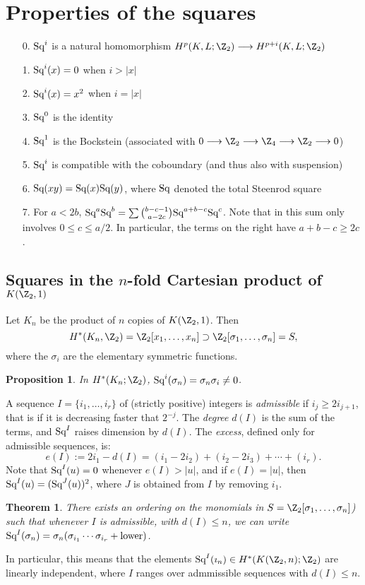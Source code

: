 \documentclass[11pt]{article}
\newcommand{\Squ}{\textup{Sq}}
\theoremstyle{plain}
\newtheorem*{thm*}{Theorem}
\newtheorem*{prop*}{Proposition}
\theoremstyle{definition}
\renewcommand{\to}{\longrightarrow}
\newcommand{\squishlist}{
  \setlength{\itemsep}{1pt}
  \setlength{\parskip}{0pt}
  \setlength{\parsep}{0pt}
}
\begin{document}
\section{Properties of the squares}
\begin{enumerate}
\squishlist
\item[0.] $\Squ^i$ is a natural homomorphism $H^p(K,L;\Z_2)\to H^{p+i}(K,L;\Z_2)$
\item[1.] $\Squ^i(x)=0$ when $i>|x|$
\item[2.] $\Squ^i(x)=x^2$ when $i=|x|$
\item[3.] $\Squ^0$ is the identity
\item[4.] $\Squ^1$ is the Bockstein (associated with $0\to\Z_2\to\Z_4\to\Z_2\to0$)
\item[5.] $\Squ^i$ is compatible with the coboundary (and thus also with suspension)
\item[6.] $\Squ(xy)=\Squ(x)\Squ(y)$, where $\Squ$ denoted the total Steenrod square
\item[7.] For $a<2b$, $\Squ^a\Squ^b=\sum{b-c-1\choose a-2c}\Squ^{a+b-c}\Squ^c$. Note that in this sum only involves $0\leq c\leq a/2$. In particular, the terms on the right have $a+b-c\geq 2c$.
\end{enumerate}
\setcounter{subsection}{2}
\subsection{Squares in the $n$-fold Cartesian product of $K(\Z_2,1)$}
Let $K_n$ be the product of $n$ copies of $K(\Z_2,1)$. Then 
\[H^*(K_n,\Z_2)=\Z_2[x_1,\ldots,x_n]\supset\Z_2[\sigma_1,\ldots,\sigma_n]=S,\]
where the $\sigma_i$ are the elementary symmetric functions.


\begin{prop*}
In $H^*(K_n;\Z_2)$, $\Squ^i(\sigma_n)=\sigma_n\sigma_i\neq0$.
\end{prop*}
A sequence $I=\{i_1,\ldots,i_r\}$ of (strictly positive) integers is \emph{admissible} if $i_j\geq 2i_{j+1}$, that is if it is decreasing faster that $2^{-j}$. The \emph{degree} $d(I)$ is the sum of the terms, and $\Squ^I$ raises dimension by $d(I)$. The \emph{excess}, defined only for admissible sequences, is:
\[e(I):=2i_1-d(I)=(i_1-2i_2)+(i_2-2i_3)+\cdots+(i_r).\]
Note that $\Squ^I(u)=0$ whenever $e(I)>|u|$, and if $e(I)=|u|$, then $\Squ^I(u)=(\Squ^J(u))^2$, where $J$ is obtained from $I$ by removing $i_1$.
\begin{thm*}
There exists an ordering on the monomials in $S=\Z_2[\sigma_1,\ldots,\sigma_n]$) such that whenever $I$ is admissible, with $d(I)\leq n$, we can write $\Squ^I(\sigma_n)=\sigma_n(\sigma_{i_1}\cdots\sigma_{i_r}+\textup{lower})$.
\end{thm*}
In particular, this means that the elements $\Squ^I(\imath_n)\in H^*(K(\Z_2,n);\Z_2)$ are linearly independent, where $I$ ranges over admmissible sequences with $d(I)\leq n$.
\end{document}
